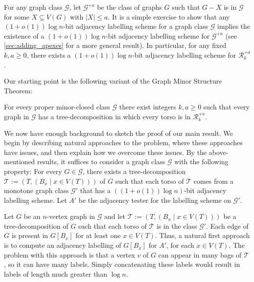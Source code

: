 \documentclass{patmorin}
\renewcommand{\ge}{\geqslant}
\renewcommand{\geq}{\geqslant}
\renewcommand{\leq}{\leqslant}
\newcommand{\vida}[1]{\noindent{\color{pink} VD: #1}}
\newcommand{\cyril}[1]{\noindent\textcolor{Green}{CG: #1}}
\newcommand{\defin}[1]{\emph{\textcolor{brightmaroon}{#1}}}
\begin{document}
For any graph class $\mathcal{G}$, let \defin{$\mathcal{G}^{+a}$} be the class of graphs $G$ such that $G-X$ is in $\mathcal{G}$ for some $X\subseteq V(G)$ with $|X|\leq a$.  It is a simple exercise to show that any $(1+o(1))\log n$-bit adjacency labelling scheme for a graph class $\mathcal{G}$ implies the existence of a $(1+o(1))\log n$-bit adjacency labelling scheme for $\mathcal{G}^{+a}$ (see \cref{sec:adding_apexes} for a more general result).  In particular, for any fixed $k,a\ge 0$, there exists a $(1+o(1))\log n$-bit adjacency labelling scheme for $\mathcal{R}_k^{+a}$. 

Our starting point is the following variant of the Graph Minor Structure Theorem:

\begin{thm}
  \label{gmpst}
  For every proper minor-closed class $\mathcal{G}$ there exist integers $k,a\geq 0$ such that every graph in $\mathcal{G}$ has a tree-decomposition in which every torso is in $\mathcal{R}_k^{+a}$.
\end{thm}

We now have enough background to sketch the proof of our main result.  We begin by describing natural approaches to the problem, where these approaches have issues, and then explain how we overcome these issues. By the above-mentioned results, it suffices to consider a graph class $\mathcal{G}$ with the following property:
For every $G\in\mathcal{G}$, there exists a tree-decomposition $\mathcal{T}:=(T,(B_x\mid x\in V(T)))$ of $G$ such that each torso of $\mathcal{T}$ comes from a monotone graph class $\mathcal{G}'$ that has a $((1+o(1))\log n)$-bit adjacency labelling scheme.  Let $A'$ be the adjacency tester for the labelling scheme on $\mathcal{G}'$. 

Let $G$ be an $n$-vertex graph in $\mathcal{G}$ and let $\mathcal{T}:=(T,(B_x\mid x\in V(T)))$ be a tree-decomposition of $G$ such that each torso of $\mathcal{T}$ is in the class $\mathcal{G}'$.  Each edge of $G$ is present in $G[B_x]$ for at least one $x\in V(T)$. Thus, a natural first approach is to compute an adjacency labelling of $G[B_x]$ for $A'$, for each $x\in V(T)$.  The problem with this approach is that a vertex $v$ of $G$ can appear in many bags of $\mathcal{T}$, so it can have many labels. Simply concatenating these labels would result in labels of length much greater than $\log n$.
\end{document}
